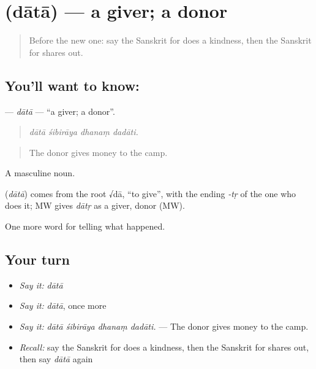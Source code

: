 \section[\texorpdfstring{\sk{दाता} (dātā)}{दाता (dātā)}]{ (dātā) — a giver; a donor}

\label{lesson:SA-C308-data}



\begin{quote}
Before the new one: say the Sanskrit for does a kindness, then the Sanskrit for shares out.
\end{quote}

\subsection*{You'll want to know: }
\textbf{} — \emph{dātā} — \textquotedblleft{}a giver; a donor\textquotedblright{}.

\begin{quote}
   
\end{quote}

\begin{quote}
\emph{dātā śibirāya dhanaṃ dadāti.}
\end{quote}

\begin{quote}
The donor gives money to the camp.
\end{quote}

A masculine noun.

\begin{cousinweb}
\textbf{} (\emph{dātā}) comes from the root √dā, \textquotedblleft{}to give\textquotedblright{}, with the ending \emph{-tṛ} of the one who does it; MW gives \emph{dātṛ} as a giver, donor (MW).
\end{cousinweb}

\begin{grammarlens}[title={What you've built}]
One more word for telling what happened.
\end{grammarlens}

\subsection*{Your turn}
\begin{itemize}
\raggedright
  \item \emph{Say it:} \emph{dātā}
  \item \emph{Say it:} \emph{dātā}, once more
  \item \emph{Say it:} \emph{dātā śibirāya dhanaṃ dadāti.} — The donor gives money to the camp.
  \item \emph{Recall:} say the Sanskrit for does a kindness, then the Sanskrit for shares out, then say \emph{dātā} again
\end{itemize}


